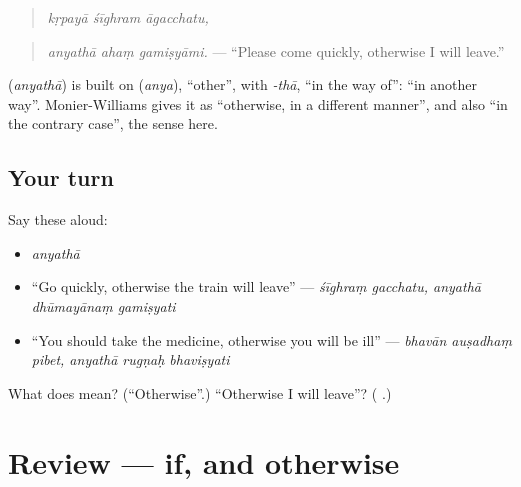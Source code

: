 \begin{quote}
\emph{kṛpayā śīghram āgacchatu,}
\end{quote}

\begin{quote}
\textbf{  }
\end{quote}

\begin{quote}
\emph{anyathā ahaṃ gamiṣyāmi.} — \textquotedblleft{}Please come quickly, otherwise I will leave.\textquotedblright{}
\end{quote}

\begin{cousinweb}
\textbf{} (\emph{anyathā}) is built on \textbf{} (\emph{anya}), \textquotedblleft{}other\textquotedblright{}, with \emph{-thā}, \textquotedblleft{}in the way of\textquotedblright{}: \textquotedblleft{}in another way\textquotedblright{}. Monier-Williams gives it as \textquotedblleft{}otherwise, in a different manner\textquotedblright{}, and also \textquotedblleft{}in the contrary case\textquotedblright{}, the sense here.
\end{cousinweb}

\subsection*{Your turn}
Say these aloud:

\begin{itemize}
\raggedright
  \item \emph{anyathā}
  \item \textquotedblleft{}Go quickly, otherwise the train will leave\textquotedblright{} — \emph{śīghraṃ gacchatu, anyathā dhūmayānaṃ gamiṣyati}
  \item \textquotedblleft{}You should take the medicine, otherwise you will be ill\textquotedblright{} — \emph{bhavān auṣadhaṃ pibet, anyathā rugṇaḥ bhaviṣyati}
\end{itemize}

\begin{tcolorbox}[breakable,colback=teal!4,colframe=teal!35!black,title={Before you move on}]
What does \textbf{} mean? (\textquotedblleft{}Otherwise\textquotedblright{}.) \textquotedblleft{}Otherwise I will leave\textquotedblright{}? (\textbf{  }.)
\end{tcolorbox}
\section[(review)]{Review — if, and otherwise}

